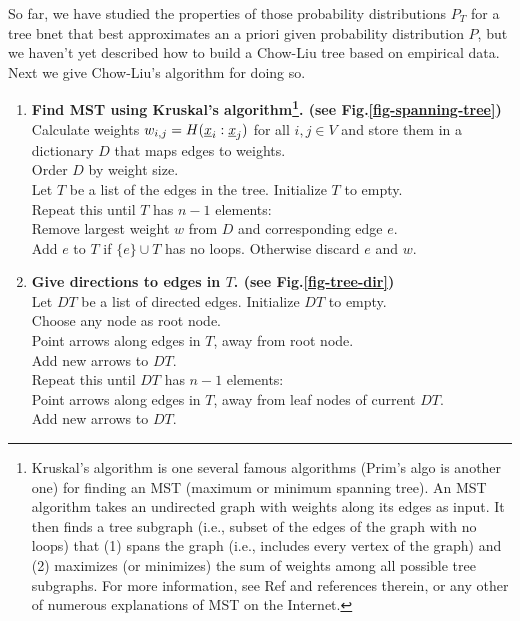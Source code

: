 So far,
we have
studied the properties
of those 
probability 
distributions
$P_T$
for a tree bnet
that 
best
approximates
an a priori given
probability
distribution $P$,
but
we haven't yet
described
how to 
build a Chow-Liu tree
based on
empirical data.
Next we give
Chow-Liu's algorithm
for doing so.


\begin{enumerate}
\item {\bf Find MST using Kruskal's 
algorithm\footnote{Kruskal's algorithm is 
one several famous algorithms (Prim's
algo is another one) for
finding an MST (maximum or
minimum spanning tree).  
An MST algorithm
 takes an
undirected graph 
with
weights along its edges as input.
It then
 finds a tree subgraph (i.e., subset
of the edges of the graph
with no loops) that
(1) spans the graph
(i.e., includes every vertex
of the graph) and (2)
maximizes (or
minimizes)
the
 sum of weights among all possible
 tree subgraphs.
For more information,
see Ref\cite{wiki-spanning-tree} and references
therein, or any other
of numerous explanations
of MST on the Internet.}.
(see Fig.\ref{fig-spanning-tree})}\\
Calculate weights $w_{i, j}=
H(\rvx_i:\rvx_j)$ for all
$i, j\in V$  and store them 
in a dictionary
 $D$
that maps edges to weights.\\
Order $D$ by weight size.\\
Let $T$ be a list of the edges in the tree. 
Initialize $T$ to  empty.\\
Repeat this until $T$ has $n-1$ elements:\\
\hspace*{1cm}Remove largest weight $w$ from $D$
and corresponding edge $e$.\\
\hspace*{1cm}Add $e$ to $T$ if $\{e\}\cup T$
has no loops. Otherwise discard $e$ and $w$.

\item{\bf  Give directions to edges in $T$.
(see Fig.\ref{fig-tree-dir})}\\
Let $DT$ be a list of directed edges.
Initialize $DT$ to empty.\\
Choose any node as root node.\\
Point arrows along edges in $T$,
away 
from root node.\\
Add new arrows to $DT$.\\ 
Repeat this until $DT$ has $n-1$ elements:\\
\hspace*{1cm}Point arrows
along edges in $T$,
away from 
leaf nodes of current  $DT$.\\
\hspace*{1cm}Add new arrows to $DT$.
\end{enumerate}

